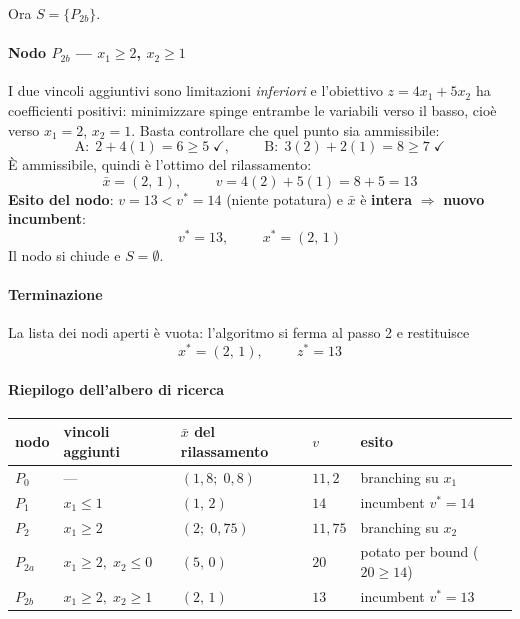 \documentclass[12pt]{extarticle} %
\begin{document}
Ora $S = \{P_{2b}\}$.

\bigskip
\paragraph{Nodo $P_{2b}$ --- $x_1 \ge 2$, $x_2 \ge 1$}
I due vincoli aggiuntivi sono limitazioni \emph{inferiori} e l'obiettivo $z = 4x_1 + 5x_2$ ha coefficienti positivi: minimizzare spinge entrambe le variabili verso il basso, cioè verso $x_1 = 2$, $x_2 = 1$. Basta controllare che quel punto sia ammissibile:
\[
\text{A}:\; 2 + 4(1) = 6 \ge 5 \;\checkmark, \hspace{1cm} \text{B}:\; 3(2) + 2(1) = 8 \ge 7 \;\checkmark
\]
È ammissibile, quindi è l'ottimo del rilassamento:
\[
\bar{x} = (2,\,1), \hspace{1cm} v = 4(2) + 5(1) = 8 + 5 = 13
\]
\textbf{Esito del nodo}: $v = 13 < v^* = 14$ (niente potatura) e $\bar{x}$ è \textbf{intera} $\Rightarrow$ \textbf{nuovo incumbent}:
\[
v^* = 13, \hspace{1cm} x^* = (2,\,1)
\]
Il nodo si chiude e $S = \emptyset$.

\paragraph{Terminazione}
La lista dei nodi aperti è vuota: l'algoritmo si ferma al passo 2 e restituisce
\[
x^* = (2,\,1), \hspace{1cm} z^* = 13
\]

\paragraph{Riepilogo dell'albero di ricerca}
\begin{center}
\begin{tabular}{lllll}
\hline
\textbf{nodo} & \textbf{vincoli aggiunti} & \textbf{$\bar{x}$ del rilassamento} & \textbf{$v$} & \textbf{esito} \\
\hline
$P_0$ & --- & $(1{,}8;\;0{,}8)$ & $11{,}2$ & branching su $x_1$ \\
$P_1$ & $x_1 \le 1$ & $(1,\,2)$ & $14$ & incumbent $v^* = 14$ \\
$P_2$ & $x_1 \ge 2$ & $(2;\;0{,}75)$ & $11{,}75$ & branching su $x_2$ \\
$P_{2a}$ & $x_1 \ge 2,\; x_2 \le 0$ & $(5,\,0)$ & $20$ & potato per bound ($20 \ge 14$) \\
$P_{2b}$ & $x_1 \ge 2,\; x_2 \ge 1$ & $(2,\,1)$ & $13$ & incumbent $v^* = 13$ \\
\hline
\end{tabular}
\end{center}
\end{document}

